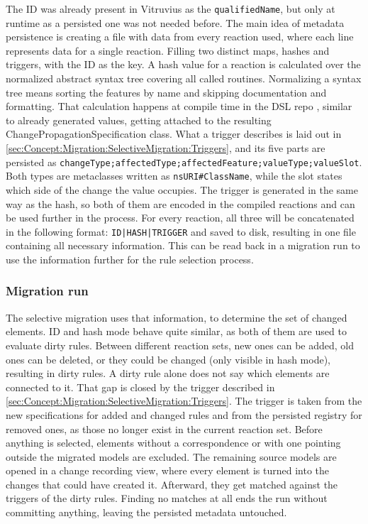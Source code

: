 The ID was already present in Vitruvius as the \texttt{qualifiedName}, but only at runtime as a persisted one was not needed before.
The main idea of metadata persistence is creating a file with data from every reaction used, where each line represents data for a single reaction.
Filling two distinct maps, hashes and triggers, with the ID as the key.
A hash value for a reaction is calculated over the normalized abstract syntax tree covering all called routines.
Normalizing a syntax tree means sorting the features by name and skipping documentation and formatting.
That calculation happens at compile time in the DSL repo \cite{vitruv-dsls-fork}, similar to already generated values, getting attached to the resulting ChangePropagationSpecification class.
What a trigger describes is laid out in \autoref{sec:Concept:Migration:SelectiveMigration:Triggers}, and its five parts are persisted as \texttt{changeType;affectedType;affectedFeature;valueType;valueSlot}.
Both types are metaclasses written as \texttt{nsURI\#ClassName}, while the slot states which side of the change the value occupies.
The trigger is generated in the same way as the hash, so both of them are encoded in the compiled reactions and can be used further in the process.
For every reaction, all three will be concatenated in the following format: \texttt{ID|HASH|TRIGGER} and saved to disk, resulting in one file containing all necessary information.
This can be read back in a migration run to use the information further for the rule selection process.

\subsubsection{Migration run}
\label{sec:Implementation:Migration:SelectiveMigration:MigrationRun}

The selective migration uses that information, to determine the set of changed elements.
ID and hash mode behave quite similar, as both of them are used to evaluate dirty rules.
Between different reaction sets, new ones can be added, old ones can be deleted, or they could be changed (only visible in hash mode), resulting in dirty rules.
A dirty rule alone does not say which elements are connected to it.
That gap is closed by the trigger described in \autoref{sec:Concept:Migration:SelectiveMigration:Triggers}.
The trigger is taken from the new specifications for added and changed rules and from the persisted registry for removed ones, as those no longer exist in the current reaction set.
Before anything is selected, elements without a correspondence or with one pointing outside the migrated models are excluded.
The remaining source models are opened in a change recording view, where every element is turned into the changes that could have created it.
Afterward, they get matched against the triggers of the dirty rules.
Finding no matches at all ends the run without committing anything, leaving the persisted metadata untouched.

